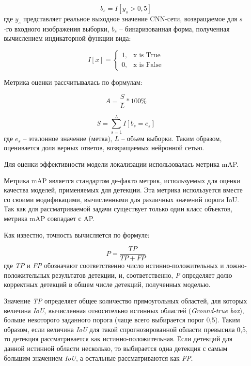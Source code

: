 \begin{equation*}
    b_s = I[y_s > 0,5]
\end{equation*}
где $y_s$ представляет реальное выходное значение CNN-сети, возвращаемое для $s$-го входного изображения выборки, $b_s$ -- бинаризованная форма, полученная вычислением индикаторной функции вида:

\begin{equation*}
    I[x] = 
    \begin{cases}
        1, & \text{x is True} \\
        0, & \text{x is False}
    \end{cases}
\end{equation*}

Метрика оценки рассчитывалась по формулам:

\begin{equation*}
    A = \frac{S}{L} * 100\%
\end{equation*}

\begin{equation*}
    S = \sum_{s=1}^L I[b_s = e_s]
\end{equation*}
где $e_s$ -- эталонное значение (метка), $L$ -- объем выборки. Таким образом, оценивается доля верных ответов, возвращаемых нейронной сетью.

Для оценки эффективности модели локализации использовалась метрика mAP.

Метрика mAP является стандартом де-факто метрик, используемых для оценки качества моделей, применяемых для детекции. Эта метрика используется вместе со своими модификацими, вычисленными для различных значений порога IoU. Так как для рассматриваемой задачи существует только один класс объектов, метрика mAP совпадает с AP.

Как известно, точность вычисляется по формуле:

\begin{equation*}
    P = \frac{TP}{TP + FP}
\end{equation*}
где \textit{TP} и \textit{FP} обозначают соответственно число истинно-положительных и ложно-положительных результатов детекции, и, соответственно, \textit{P} определяет долю корректных детекций в общем числе детекций, полученных моделью.

Значение \textit{TP} определяет общее количество прямоугольных областей, для которых величина \textit{IoU}, вычисленная относительно истинных областей (\textit{Ground-true box}), больше некоторого заданного порога (чаще всего выбирается порог 0,5). Таким образом, если величина \textit{IoU} для такой спрогнозированной области превысила 0,5, то детекция рассматривается как истинно-положительная. Если детекций для данной истинной области несколько, то выбирается одна детекция с самым большим значением \textit{IoU}, а остальные рассматриваются как \textit{FP}.

